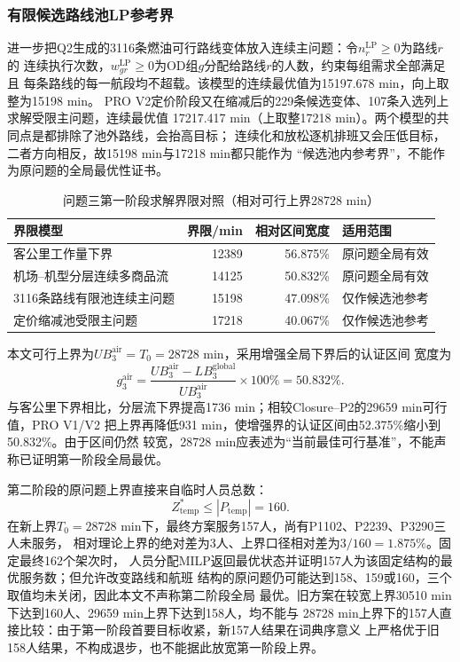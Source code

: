 \documentclass[UTF8,a4paper,zihao=5]{ctexart}
\begin{document}
\subsubsection{有限候选路线池LP参考界}

进一步把Q2生成的3116条燃油可行路线变体放入连续主问题：令$n_r^{\mathrm{LP}}\geq0$为路线$r$的
连续执行次数，$w_{gr}^{\mathrm{LP}}\geq0$为OD组$g$分配给路线$r$的人数，约束每组需求全部满足且
每条路线的每一航段均不超载。该模型的连续最优值为15197.678 min，向上取整为15198 min。
PRO V2定价阶段又在缩减后的229条候选变体、107条入选列上求解受限主问题，连续最优值
17217.417 min（上取整17218 min）。两个模型的共同点是都排除了池外路线，会抬高目标；
连续化和放松逐机排班又会压低目标，二者方向相反，故15198 min与17218 min都只能作为
“候选池内参考界”，不能作为原问题的全局最优性证书。

\begin{table}[htbp]
  \centering
  \caption{问题三第一阶段求解界限对照（相对可行上界28728 min）}
  \label{tab:q3-bound-comparison}
  \begin{tabularx}{\linewidth}{XrrX}
    \toprule
    界限模型 & 界限/min & 相对区间宽度 & 适用范围 \\
    \midrule
    客公里工作量下界 & 12389 & 56.875\% & 原问题全局有效 \\
    机场--机型分层连续多商品流 & 14125 & 50.832\% & 原问题全局有效 \\
    3116条路线有限池连续主问题 & 15198 & 47.098\% & 仅作候选池参考 \\
    定价缩减池受限主问题 & 17218 & 40.067\% & 仅作候选池参考 \\
    \bottomrule
  \end{tabularx}
\end{table}

本文可行上界为$UB_3^{\mathrm{air}}=T_0=28728$ min，采用增强全局下界后的认证区间
宽度为
\begin{equation}
  g_3^{\mathrm{air}}
  =\frac{UB_3^{\mathrm{air}}-LB_3^{\mathrm{global}}}{UB_3^{\mathrm{air}}}
  \times100\%=50.832\%.
  \label{eq:q3-aircraft-bound-gap}
\end{equation}
与客公里下界相比，分层流下界提高1736 min；相较Closure--P2的29659 min可行值，PRO V1/V2
把上界再降低931 min，使增强界的认证区间由52.375\%缩小到50.832\%。由于区间仍然
较宽，28728 min应表述为“当前最佳可行基准”，不能声称已证明第一阶段全局最优。

第二阶段的原问题上界直接来自临时人员总数：
\begin{equation}
  Z_{\mathrm{temp}}^*\le |P_{\mathrm{temp}}|=160.
  \label{eq:q3-temporary-upper-bound}
\end{equation}
在新上界$T_0=28728$ min下，最终方案服务157人，尚有P1102、P2239、P3290三人未服务，
相对理论上界的绝对差为3人、上界口径相对差为$3/160=1.875\%$。固定最终162个架次时，
人员分配MILP返回最优状态并证明157人为该固定结构的最优服务数；但允许改变路线和航班
结构的原问题仍可能达到158、159或160，三个取值均未关闭，因此本文不声称第二阶段全局
最优。旧方案在较宽上界30510 min下达到160人、29659 min上界下达到158人，均不能与
28728 min上界下的157人直接比较：由于第一阶段首要目标收紧，新157人结果在词典序意义
上严格优于旧158人结果，不构成退步，也不能据此放宽第一阶段上界。
\end{document}
